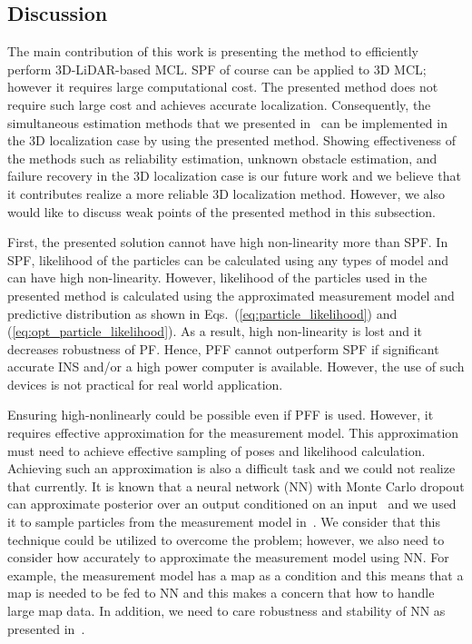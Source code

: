 \documentclass[letterpaper, 10 pt, conference]{ieeeconf}  %
\begin{document}
\subsection{Discussion}
\label{subsec:discussion}

The main contribution of this work is presenting the method to efficiently perform 3D-LiDAR-based MCL.
SPF of course can be applied to 3D MCL; however it requires large computational cost.
The presented method does not require such large cost and achieves accurate localization.
Consequently, the simultaneous estimation methods that we presented in~\cite{AkaiJFR2023} can be implemented in the 3D localization case by using the presented method.
Showing effectiveness of the methods such as reliability estimation, unknown obstacle estimation, and failure recovery in the 3D localization case is our future work and we believe that it contributes realize a more reliable 3D localization method.
However, we also would like to discuss weak points of the presented method in this subsection.

First, the presented solution cannot have high non-linearity more than SPF.
In SPF, likelihood of the particles can be calculated using any types of model and can have high non-linearity.
However, likelihood of the particles used in the presented method is calculated using the approximated measurement model and predictive distribution as shown in Eqs.~(\ref{eq:particle_likelihood}) and (\ref{eq:opt_particle_likelihood}).
As a result, high non-linearity is lost and it decreases robustness of PF.
Hence, PFF cannot outperform SPF if significant accurate INS and/or a high power computer is available.
However, the use of such devices is not practical for real world application.%

Ensuring high-nonlinearly could be possible even if PFF is used.
However, it requires effective approximation for the measurement model.
This approximation must need to achieve effective sampling of poses and likelihood calculation.
Achieving such an approximation is also a difficult task and we could not realize that currently.
It is known that a neural network (NN) with Monte Carlo dropout can approximate posterior over an output conditioned on an input~\cite{Gal2015BayesianCN} and we used it to sample particles from the measurement model in~\cite{AkaiICRA2020}.
We consider that this technique could be utilized to overcome the problem; however, we also need to consider how accurately to approximate the measurement model using NN.
For example, the measurement model has a map as a condition and this means that a map is needed to be fed to NN and this makes a concern that how to handle large map data.
In addition, we need to care robustness and stability of NN as presented in~\cite{sattler19cvpr}.
\end{document}
